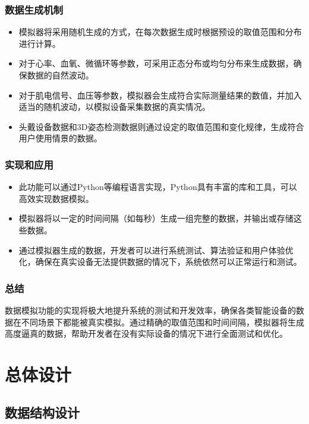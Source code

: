 \documentclass[oneside]{xduugthesis}
\begin{document}
\subsection{数据生成机制}
\begin{itemize}[nosep]
    \item 模拟器将采用随机生成的方式，在每次数据生成时根据预设的取值范围和分布进行计算。
    \item 对于心率、血氧、微循环等参数，可采用正态分布或均匀分布来生成数据，确保数据的自然波动。
    \item 对于肌电信号、血压等参数，模拟器会生成符合实际测量结果的数值，并加入适当的随机波动，以模拟设备采集数据的真实情况。
    \item 头戴设备数据和3D姿态检测数据则通过设定的取值范围和变化规律，生成符合用户使用情景的数据。
\end{itemize}

\subsection{实现和应用}
\begin{itemize}[nosep]
    \item 此功能可以通过Python等编程语言实现，Python具有丰富的库和工具，可以高效实现数据模拟。
    \item 模拟器将以一定的时间间隔（如每秒）生成一组完整的数据，并输出或存储这些数据。
    \item 通过模拟器生成的数据，开发者可以进行系统测试、算法验证和用户体验优化，确保在真实设备无法提供数据的情况下，系统依然可以正常运行和测试。
\end{itemize}

\subsection{总结}
数据模拟功能的实现将极大地提升系统的测试和开发效率，确保各类智能设备的数据在不同场景下都能被真实模拟。通过精确的取值范围和时间间隔，模拟器将生成高度逼真的数据，帮助开发者在没有实际设备的情况下进行全面测试和优化。


\let\cleardoublepage\clearpage
\chapter{总体设计}

\section{数据结构设计}
\end{document}
